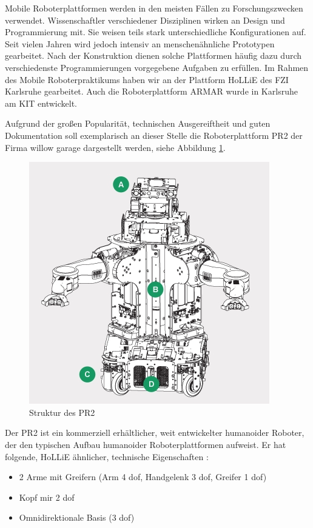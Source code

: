 Mobile Roboterplattformen werden in den meisten Fällen zu Forschungszwecken verwendet.
Wissenschaftler verschiedener Disziplinen wirken an Design und Programmierung mit.
Sie weisen teils stark unterschiedliche Konfigurationen auf.
Seit vielen Jahren wird jedoch intensiv an menschenähnliche Prototypen gearbeitet.
Nach der Konstruktion dienen solche Plattformen häufig dazu durch verschiedenste Programmierungen vorgegebene Aufgaben zu erfüllen.
Im Rahmen des Mobile Roboterpraktikums haben wir an der Plattform HoLLiE des FZI Karlsruhe gearbeitet.
Auch die Roboterplattform ARMAR wurde in Karlsruhe am KIT entwickelt.

Aufgrund der großen Popularität, technischen Ausgereiftheit und guten Dokumentation soll exemplarisch an dieser Stelle die Roboterplattform PR2 der Firma willow garage dargestellt werden, siehe Abbildung  \ref{fig:PR2Struktur}.

\begin{figure}[h]
\center
\includegraphics[scale=0.5]{graphics/PR2Struktur.jpg}
\caption{\label{fig:PR2Struktur} Struktur des PR2 \cite{kinect_5}}
\end{figure}

Der PR2 ist ein kommerziell erhältlicher, weit entwickelter humanoider Roboter, der den typischen Aufbau humanoider Roboterplattformen aufweist.
Er hat folgende, HoLLiE ähnlicher, technische Eigenschaften \cite{kinect_5}:

\begin{itemize}
  \item 2 Arme mit Greifern (Arm 4 \gls{dof}, Handgelenk 3 \gls{dof}, Greifer 1 \gls{dof})
  \item Kopf mir 2 \gls{dof}
  \item Omnidirektionale Basis (3 \gls{dof})
\end{itemize}

